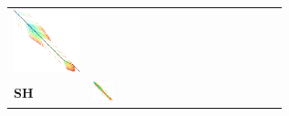 \begin{figure}[H]
\begin{tabular}{l>{\centering}m{0.12\linewidth}>{\centering}m{0.12\linewidth}>{\centering}m{0.12\linewidth}>{\centering\arraybackslash}m{0.35\linewidth}}
    \includegraphics[scale=0.09]{imgs/comparison/dijkstra-noprune-dt.png} &
    \\[1cm]
    \textbf{SH} &
    \includegraphics[scale=0.09]{imgs/comparison/sh-noprune.png} &

\end{tabular}
\end{figure}
